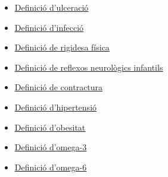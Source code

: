 \documentclass[a4paper,12pt]{article}
\begin{document}
\begin{itemize}
    \item \href{https://www.cancer.gov/espanol/publicaciones/diccionarios/diccionario-cancer/def/ulceracion}{\underline{Definició d'ulceració}}
    \item \href{https://policlinicametropolitana.org/informacion-de-salud/infecciones-tipo-sintomas-prevencion/}{\underline{Definició d'infecció}}
    \item \href{https://www.fisioterapia-online.com/glosario/rigidez#:~:text=Definici%C3%B3n%20%2D%20Qu%C3%A9%20es%20rigidez&text=En%20el%20%C3%A1rea%20de%20la,dificultad%20para%20movilizar%20las%20articulaciones.}{\underline{Definició de rigidesa física}}
    \item \href{https://www.elsevier.es/es-revista-neurologia-argentina-301-articulo-reflejos-patologicos-S1853002818300429#:~:text=El%20reflejo%20se%20define%20como,pudiendo%20ser%20o%20no%20consciente.}{\underline{Definició de reflexos neurològics infantils}}
    \item \href{https://www.topdoctors.es/diccionario-medico/contractura-muscular}{\underline{Definició de contractura}}
    \item \href{https://www.who.int/es/news-room/fact-sheets/detail/hypertension#:~:text=Se%20habla%20de%20hipertensi%C3%B3n%20cuando,es%20tomarse%20la%20tensi%C3%B3n%20arterial.}{\underline{Definició d'hipertensió}}
    \item \href{https://mutuaterrassa.com/blogs/es/endocrinologia/obesitat}{\underline{Definició d'obesitat}}
    \item \href{https://medlineplus.gov/spanish/ency/patientinstructions/000767.htm}{\underline{Definició d'omega-3}}
    \item \href{https://medlineplus.gov/spanish/druginfo/natural/496.html}{\underline{Definició d'omega-6}}
\end{itemize}
\end{document}
